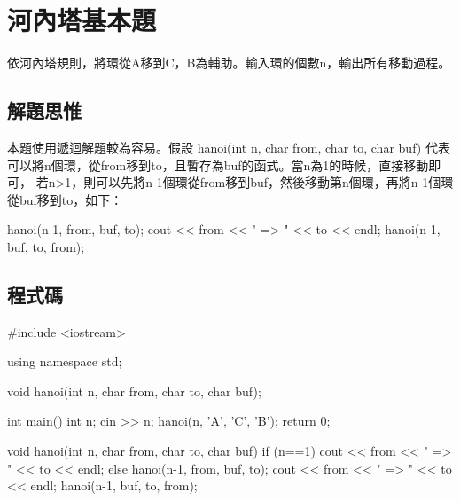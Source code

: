 \section{河內塔基本題}
依河內塔規則，將環從A移到C，B為輔助。輸入環的個數n，輸出所有移動過程。

\subsection{解題思惟}
本題使用遞迴解題較為容易。假設 hanoi(int n, char from, char to, char buf) 代表可以將n個環，從from移到to，且暫存為buf的函式。當n為1的時候，直接移動即可，
若n>1，則可以先將n-1個環從from移到buf，然後移動第n個環，再將n-1個環從buf移到to，如下：
\begin{inside}
	hanoi(n-1, from, buf, to);
	cout << from << " => " << to << endl;
	hanoi(n-1, buf, to, from);
\end{inside}	
			
\subsection{程式碼}
\begin{cppcode}
#include <iostream>

using namespace std;

void hanoi(int n, char from, char to, char buf);

int main()
{
	int n;
	cin >> n;
	hanoi(n, 'A', 'C', 'B');
	return 0;
}

void hanoi(int n, char from, char to, char buf)
{
	if (n==1) {
		cout << from << " => " << to << endl;
	} else {
		hanoi(n-1, from, buf, to);
		cout << from << " => " << to << endl;
		hanoi(n-1, buf, to, from);
	}
}
\end{cppcode}
